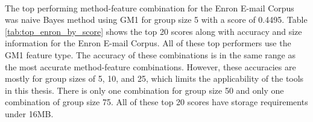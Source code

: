 \paragraph*{}  The top performing method-feature combination for the Enron E-mail Corpus was naive Bayes method using GM1 for group size 5 with a score of 0.4495.  Table \ref{tab:top_enron_by_score} shows the top 20 scores along with accuracy and size information for the Enron E-mail Corpus.  All of these top performers use the GM1 feature type. The accuracy of these combinations is in the same range as the most accurate method-feature combinations. However, these accuracies are mostly for group sizes of 5, 10, and 25, which limits the applicability of the tools in this thesis.  There is only one combination for group size 50 and only one combination of group size 75.  All of these top 20 scores have storage requirements under 16MB.


